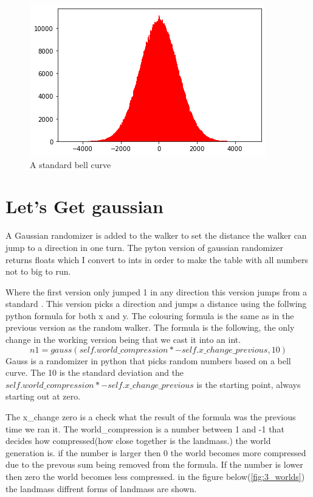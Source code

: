 \documentclass[8pt,letterpaper]{article}
\begin{document}
\begin{figure}[!h]
	\centering
	\includegraphics[scale = 0.7]{Images/bell_curve.png}
	\caption{A standard bell curve}
	\label{fig:bell_curve.png}
\end{figure}

\section{Let's Get gaussian}

A Gaussian randomizer is added to the walker to set the distance the walker can jump to a direction in one turn. The pyton version of gaussian randomizer returns floats which I convert to ints in order to make the table with all numbers not to big to run.

Where the first version only jumped 1 in any direction this version jumps from a standard . This version picks a direction and jumps a distance using the follwing python formula for both x and y.
The colouring formula is the same as in the previous version as the random walker. The formula is the following, the only change in the working version being that we cast it into an int.
\begin{equation}
	\label{eq:RandomWalkerFormula}
	n1 = gauss(self.world\_compression * -self.x\_change\_previous,10)
\end{equation}
Gauss is a randomizer in python that picks random numbers based on a bell curve. The 10 is the standard deviation and the $self.world\_compression * -self.x\_change\_previous$ is the starting point, always starting out at zero.

The x\_change zero is a check what the result of the formula was the previous time we ran it. The world\_compression is a number between 1 and -1 that decides how compressed(how close together is the landmass.) the world generation is. if the number is larger then 0 the world becomes more compressed due to the prevous sum being removed from the formula. If the number is lower then zero the world becomes less compressed. in the figure below(\ref{fig:3_worlds}) the landmass diffrent forms of landmass are shown.
\end{document}
